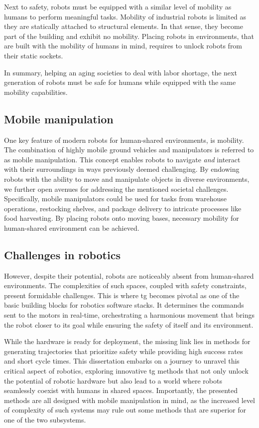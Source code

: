 Next to
safety, robots must be equipped with a similar level of
mobility as humans to perform meaningful tasks. Mobility of
industrial robots is limited as they are statically
attached to structural elements. In that sense, they become
part of the building and exhibit no mobility. Placing
robots in environments, that are built with the mobility of
humans in mind, requires to unlock robots from their static
sockets.

In summary, helping an aging societies to deal with labor
shortage, the next generation of robots must be safe for
humans while equipped with the same mobility capabilities.

\subsection{Mobile manipulation}
\label{sec:mobile_manipulation}

One key feature of modern robots for human-shared
environments, is mobility. The combination of highly mobile
ground vehicles and manipulators is referred to as mobile
manipulation. This concept enables robots to navigate
\textit{and}
interact with their surroundings in ways previously deemed
challenging. By endowing robots with the ability to move and
manipulate objects in diverse environments, we further open
avenues for addressing the mentioned societal challenges.
Specifically, mobile manipulators could be used for tasks
from warehouse operations, restocking shelves, and package
delivery to intricate processes like food harvesting.
By placing robots onto moving bases, necessary mobility for
human-shared environment can be achieved.

\subsection{Challenges in robotics}

However, despite their potential, robots are noticeably
absent from human-shared environments. The complexities of
such spaces, coupled with safety constraints, present
formidable challenges. This is where \ac{tg}
becomes pivotal as one of the basic building blocks for
robotics software stacks. It determines the commands sent to
the motors in real-time, orchestrating a harmonious movement
that brings the robot closer to its goal while ensuring the
safety of itself and its environment.

While the hardware is ready for deployment, the
missing link lies in methods for generating trajectories
that prioritize safety while providing high success rates
and short cycle times.
This dissertation embarks on a journey to unravel this
critical aspect of robotics, exploring innovative \ac{tg}
methods that not only unlock the potential of
robotic hardware but also lead to a world where robots
seamlessly coexist with humans in shared spaces.
Importantly, the presented methods are all designed with
mobile manipulation in mind, as the increased level of
complexity of such systems may rule out some methods that
are superior for one of the two subsystems.

